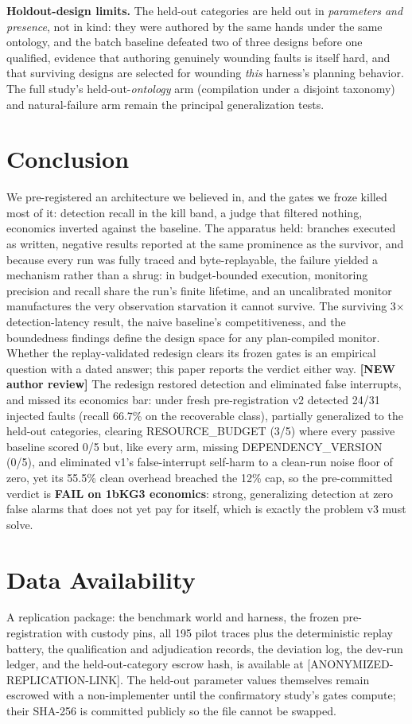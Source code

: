 \documentclass[acmsmall,screen,review,anonymous]{acmart}
\begin{document}
\textbf{Holdout-design limits.} The held-out categories are held out in \emph{parameters and presence}, not in kind: they were authored by the same hands under the same ontology, and the batch baseline defeated two of three designs before one qualified, evidence that authoring genuinely wounding faults is itself hard, and that surviving designs are selected for wounding \emph{this} harness's planning behavior. The full study's held-out-\emph{ontology} arm (compilation under a disjoint taxonomy) and natural-failure arm remain the principal generalization tests.

\section{Conclusion}
We pre-registered an architecture we believed in, and the gates we froze killed most of it: detection recall in the kill band, a judge that filtered nothing, economics inverted against the baseline. The apparatus held: branches executed as written, negative results reported at the same prominence as the survivor, and because every run was fully traced and byte-replayable, the failure yielded a mechanism rather than a shrug: in budget-bounded execution, monitoring precision and recall share the run's finite lifetime, and an uncalibrated monitor manufactures the very observation starvation it cannot survive. The surviving 3$\times$ detection-latency result, the naive baseline's competitiveness, and the boundedness findings define the design space for any plan-compiled monitor. Whether the replay-validated redesign clears its frozen gates is an empirical question with a dated answer; this paper reports the verdict either way. \textbf{[NEW \textperiodcentered{} author review]} The redesign restored detection and eliminated false interrupts, and missed its economics bar: under fresh pre-registration v2 detected 24/31 injected faults (recall 66.7\% on the recoverable class), partially generalized to the held-out categories, clearing RESOURCE\_BUDGET (3/5) where every passive baseline scored 0/5 but, like every arm, missing DEPENDENCY\_VERSION (0/5), and eliminated v1's false-interrupt self-harm to a clean-run noise floor of zero, yet its 55.5\% clean overhead breached the 12\% cap, so the pre-committed verdict is \textbf{FAIL on 1bKG3 economics}: strong, generalizing detection at zero false alarms that does not yet pay for itself, which is exactly the problem v3 must solve.

\section*{Data Availability}
A replication package: the benchmark world and harness, the frozen pre-registration with custody pins, all 195 pilot traces plus the deterministic replay battery, the qualification and adjudication records, the deviation log, the dev-run ledger, and the held-out-category escrow hash, is available at [ANONYMIZED-REPLICATION-LINK]. The held-out parameter values themselves remain escrowed with a non-implementer until the confirmatory study's gates compute; their SHA-256 is committed publicly so the file cannot be swapped.
\end{document}
